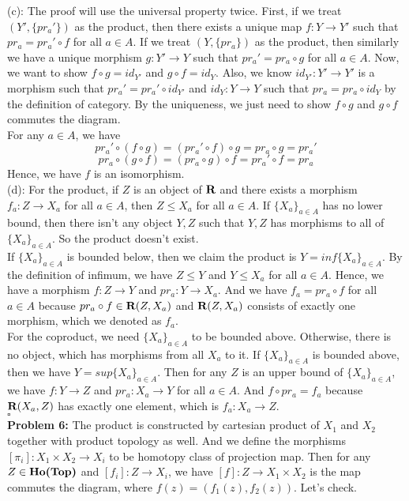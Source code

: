 \documentclass[12pt]{amsart}
\begin{document}
(c): The proof will use the universal property twice. First, if we treat $(Y',\{pr_a'\})$ as the product, then there exists a unique map $f:Y\to Y'$ such that $pr_a=pr_a'\circ f$ for all $a\in A$. If we treat $(Y,\{pr_a\})$ as the product, then similarly we have a unique morphism $g:Y'\to Y$ such that $pr_a'=pr_a\circ g$ for all $a\in A$. Now, we want to show $f\circ g=id_{Y'}$ and $g\circ f=id_{Y}$. Also, we know $id_{Y'}:Y'\to Y'$ is a morphism such that  $pr_a'=pr_a'\circ id_{Y'}$ and $id_Y:Y\to Y$ such that $pr_a=pr_a\circ id_Y$ by the definition of category. By the uniqueness, we just need to show $f\circ g$ and $g\circ f$ commutes the diagram.\\ 
For any $a\in A$, we have 
\[pr_a'\circ (f\circ g)=(pr_a'\circ f)\circ g=pr_a\circ g=pr_a'\] 
\[pr_a\circ (g\circ f)=(pr_a\circ g)\circ f=pr_a'\circ f=pr_a\]
Hence, we have $f$ is an isomorphism.\\
(d): For the product, if $Z$ is an object of $ \normalfont\textbf{R}$ and there exists a morphism $f_a:Z\to X_a$ for all $a\in A$, then $Z\leq X_a$ for all $a\in A$. If $\{X_a\}_{a\in A}$ has no lower bound, then there isn't any object $Y,Z$ such that $Y,Z$ has morphisms to all of $\{X_a\}_{a\in A}$. So the product doesn't exist.\\
If $\{X_a\}_{a\in A}$ is bounded below, then we claim the product is $Y=inf\{X_a\}_{a\in A}$. By the definition of infimum, we have $Z\leq Y$ and $Y\leq X_a$ for all $a\in A$. Hence, we have a morphism $f:Z\to Y$ and $pr_a:Y\to X_a$. And we have $f_a=pr_a\circ f$ for all $a\in A$ because $pr_a\circ f\in \normalfont\textbf{R}(Z,X_a)$ and $\normalfont\textbf{R}(Z,X_a)$ consists of exactly one morphism, which we denoted as $f_a$.\\
For the coproduct, we need $\{X_a\}_{a\in A}$ to be bounded above. Otherwise, there is no object, which has morphisms from all $X_a$ to it. If $\{X_a\}_{a\in A}$ is bounded above, then we have $Y=sup\{X_a\}_{a\in A}$. Then for any $Z$ is an upper bound of $\{X_a\}_{a\in A}$, we have $f:Y\to Z$ and $pr_a:X_a\to Y$ for all $a\in A$. And $f\circ pr_a=f_a$ because $ \normalfont\textbf{R}(X_a,Z)$ has exactly one element, which is $f_a:X_a\to Z$.
\\\phantom{qed}\hfill$\square$\\
\textbf{Problem 6:} The product is constructed by cartesian product of $X_1$ and $X_2$ together with product topology as well. And we define the morphisms $[\pi_i]:X_1\times X_2\to X_i$ to be homotopy class of projection map. Then for any $Z\in \normalfont\textbf{Ho(Top)}$ and $[f_i]:Z\to X_i$, we have $[f]:Z\to X_1\times X_2$ is the map commutes the diagram, where $f(z)=(f_1(z),f_2(z))$. Let's check.\\
\end{document}
